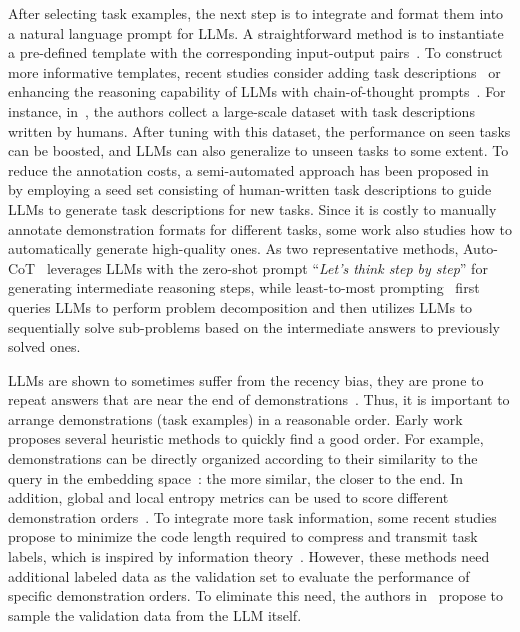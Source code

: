 After selecting task examples, the next step is to integrate and format them into a natural language prompt for LLMs. 
A straightforward method is to instantiate a pre-defined template with the corresponding input-output pairs~\cite{Liu-survey-2023-Pre-train}.
To construct more informative templates, recent studies consider adding task descriptions~\cite{Chung-arxiv-2022-Scaling} or enhancing the reasoning capability of LLMs with chain-of-thought prompts~\cite{Wei-arxiv-2022-chain}.
For instance, in~\cite{Mishra-ACL-2022-Cross}, the authors collect a large-scale dataset with task descriptions written by humans.
After tuning with this dataset, the performance on seen tasks can be boosted, and LLMs can also generalize to unseen tasks to some extent.
To reduce the annotation costs, a semi-automated approach has been proposed in~\cite{Wang-arXiv-2022-Self} by employing a seed set consisting of human-written task descriptions to guide LLMs to generate task descriptions for new tasks. 
Since it is costly to manually annotate demonstration formats for different tasks, some work also studies how to automatically generate high-quality ones. 
As two representative methods, Auto-CoT~\cite{Zhang-arxiv-2022-Automatic} leverages LLMs with the zero-shot prompt ``\emph{Let’s think step by step}'' for generating intermediate reasoning steps, while least-to-most prompting~\cite{Zhou-arxiv-2022-Least} first queries LLMs to perform problem decomposition and then utilizes LLMs to sequentially solve sub-problems based on the intermediate answers to previously solved ones.  

LLMs are shown to sometimes suffer from the {recency} bias, \ie they are prone to repeat answers that are near the end of demonstrations~\cite{Zhao-ICML-2021-Calibrate}. 
Thus, it is important to arrange demonstrations (\ie task examples) in a reasonable order.
Early work proposes several heuristic methods to quickly find a good order.  
For example, demonstrations can be directly organized according to their similarity to the query in the embedding space~\cite{Liu-ACL-2022-What}: the more similar, the closer to the end.
In addition, global and local entropy metrics can be used to score different demonstration orders~\cite{Lu-ACL-2022-Fantasically}. 
To integrate more task information, some recent studies propose to minimize the  
{code length} required to compress and transmit task labels, which is inspired by information theory~\cite{Wu-arxiv-2022-Self}.
However, these methods need additional labeled data as the {validation set to evaluate the performance of specific demonstration orders}. 
To eliminate this need, the authors in~\cite{Lu-ACL-2022-Fantasically} propose to sample the validation data from the LLM itself. 

